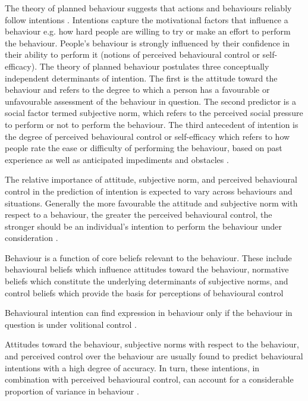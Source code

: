 The theory of planned behaviour suggests that actions and behaviours reliably follow intentions \citep{ajzen1985intentions}. Intentions capture the motivational factors that influence a behaviour e.g. how hard people are willing to try or make an effort to perform the behaviour. People’s behaviour is strongly influenced by their confidence in their ability to perform it (notions of perceived behavioural control or self-efficacy). The theory of planned behaviour postulates three conceptually independent determinants of intention. The first is the attitude toward the behaviour and refers to the degree to which a person has a favourable or unfavourable assessment of the behaviour in question. The second predictor is a social factor termed subjective norm, which refers to the perceived social pressure to perform or not to perform the behaviour. The third antecedent of intention is the degree of perceived behavioural control or self-efficacy which refers to how people rate the ease or difficulty of performing the behaviour, based on past experience as well as anticipated impediments and obstacles \citep{ajzen1991theory}.

The relative importance of attitude, subjective norm, and perceived behavioural control in the prediction of intention is expected to vary across behaviours and situations. Generally the more favourable the attitude and subjective norm with respect to a behaviour, the greater the perceived behavioural control, the stronger should be an individual’s intention to perform the behaviour under consideration \citep{ajzen1991theory}. 

Behaviour is a function of core beliefs relevant to the behaviour. These include behavioural beliefs which influence attitudes toward the behaviour, normative beliefs which constitute the underlying determinants of subjective norms, and control beliefs which provide the basis for perceptions of behavioural control \citep{ajzen1991theory} 

Behavioural intention can find expression in behaviour only if the behaviour in question is under volitional control \citep{ajzen1991theory}. 

Attitudes toward the behaviour, subjective norms with respect to the behaviour, and perceived control over the behaviour are usually found to predict behavioural intentions with a high degree of accuracy. In turn, these intentions, in combination with perceived behavioural control, can account for a considerable proportion of variance in behaviour \citep{ajzen1991theory}.


